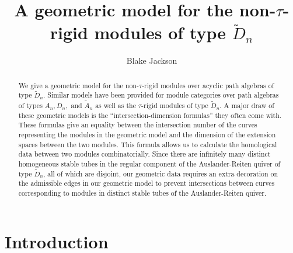 \documentclass[11pt]{amsart}
\theoremstyle{plain}
\theoremstyle{definition}
\numberwithin{equation}{section}
\begin{document}
\title[A geometric model for the non-$\tau$-rigid modules of type $\widetilde{D}_n$]{A geometric model for the non-$\tau$-rigid modules of type $\widetilde{D}_n$}
\author[Blake Jackson]{Blake Jackson}
\address{Department of Mathematics, University of Connecticut,
	Storrs, CT 06269, U.S.A.}




\begin{abstract}
    We give a geometric model for the non-$\tau$-rigid modules over acyclic path algebras of type $\widetilde{D}_n$. Similar models have been provided for module categories over path algebras of types $A_n, D_n,$ and $\widetilde{A}_n$ as well as the $\tau$-rigid modules of type $\widetilde{D}_n$. A major draw of these geometric models is the ``intersection-dimension formulas'' they often come with. These formulas give an equality between the intersection number of the curves representing the modules in the geometric model and the dimension of the extension spaces between the two modules. This formula allows us to calculate the homological data between two modules combinatorially. Since there are infinitely many distinct homogeneous stable tubes in the regular component of the Auslander-Reiten quiver of type $\widetilde{D}_n$, all of which are disjoint, our geometric data requires an extra decoration on the admissible edges in our geometric model to prevent intersections between curves corresponding to modules in distinct stable tubes of the Auslander-Reiten quiver.
\end{abstract}


\maketitle


\section{Introduction}
\end{document}
